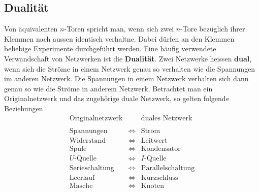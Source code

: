 \subsection{Dualität}
Von äquivalenten $n$-Toren spricht man, wenn sich zwei $n$-Tore bezüglich ihrer Klemmen nach aussen identisch verhaltne. Dabei dürfen an den Klemmen beliebige Experimente durchgeführt werden.
\newline\newline
Eine häufig verwendete Verwandschaft von Netzwerken ist die \textbf{Dualität}. Zwei Netzwerke heissen \textbf{dual}, wenn sich die Ströme in einem Netzwerk genau so verhalten wie die Spannungen im anderen Netzwerk. Die Spannungen in einem Netzwerk verhalten sich dann genau so wie die Ströme in anderem Netzwerk.
\newline\newline
Betrachtet man ein Originalnetzwerk und das zugehörige duale Netzwerk, so gelten folgende Beziehungen
\begin{equation}
\boxed{\begin{array}{lll}
\text{Originalnetzwerk}&&\text{duales Netzwerk}\\\\
\text{Spannungen}&\Longleftrightarrow & \text{Strom}\\
\text{Widerstand}&\Longleftrightarrow & \text{Leitwert}\\
\text{Spule}&\Longleftrightarrow & \text{Kondensator}\\
U\text{-Quelle}&\Longleftrightarrow & I\text{-Quelle}\\
\text{Serieschaltung}&\Longleftrightarrow & \text{Parallelschaltung}\\
\text{Leerlauf}&\Longleftrightarrow & \text{Kurzschluss}\\
\text{Masche}&\Longleftrightarrow & \text{Knoten}\\
\end{array}}
\end{equation}


